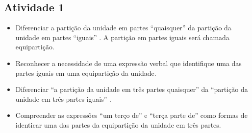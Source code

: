 \begin{multicols}{2}

\subsection{Atividade 1}    \vspace{.1cm}

\begin{itemize} %
    \item       Diferenciar a partição da unidade em partes       ``quaisquer''       da partição da unidade em partes       ``iguais''      . A partição em partes iguais será chamada equipartição.
    \item       Reconhecer a necessidade de uma expressão verbal que identifique uma das partes iguais em uma equipartição da unidade.
    \item       Diferenciar       ``a partição da unidade em três partes quaisquer''       da       ``partição da unidade em três partes iguais''      .
    \item       Compreender as expressões ``um terço de'' e ``terça parte de'' como formas de identicar uma das partes da equipartição da unidade em três partes.
\end{itemize} %
 \vspace{.1cm}


   \vspace{.1cm}


\end{multicols}
